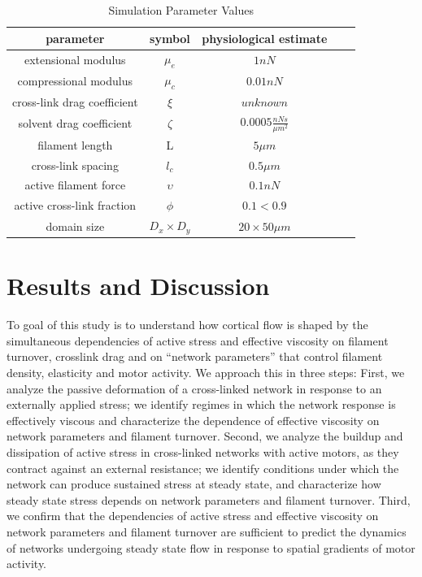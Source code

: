 \documentclass[10pt,letterpaper]{article}
\begin{document}
\begin{table}[h]
\centering
\caption{Simulation Parameter Values}
\label{table:para}
\begin{tabular}{|c|c|c|c|c|}
\hline
{\bf parameter}             & {\bf symbol} & {\bf physiological estimate}          \\ \hline
extensional modulus         & $\mu_e$        & $1 nN $                                               \\
compressional modulus             & $\mu_c$     & $ 0.01 nN $                           \\
cross-link drag coefficient & $\xi$      & $unknown $              \\
solvent drag coefficient     & $\zeta$        & $0.0005 \frac{nN s}{\mu m^2} $      \\
filament length             & L            & $5 \mu m$                                          \\
cross-link spacing          & $l_c$        & $0.5 \mu m$                                         \\
active filament force          & $\upsilon$        & $0.1 nN$                                         \\
active cross-link fraction          & $\phi$        & $0.1<0.9$                                         \\
domain size                 & $D_x\times D_y$            & $20\times 50 \mu m$                                 \\ \hline
\end{tabular}
\end{table}



\section*{Results and Discussion}
To goal of this study is to understand how cortical flow is shaped by the simultaneous dependencies of active stress and effective viscosity on filament turnover, crosslink drag and on ``network parameters'' that control  filament density, elasticity and motor activity.   We approach this in three steps: First, we analyze the passive deformation of a cross-linked network in response to an externally applied stress; we identify regimes in which the network response is effectively viscous and characterize the dependence of effective viscosity on network parameters and filament turnover.  Second, we analyze the buildup and dissipation of active stress in cross-linked networks with active motors, as they contract against an external resistance; we identify conditions under which the network can produce sustained stress at steady state, and characterize how steady state stress depends on network parameters and filament turnover. Third, we confirm that the dependencies of active stress and effective viscosity on network parameters and filament turnover are sufficient to predict the dynamics of networks undergoing steady state flow in response to spatial gradients of motor activity.
\end{document}
